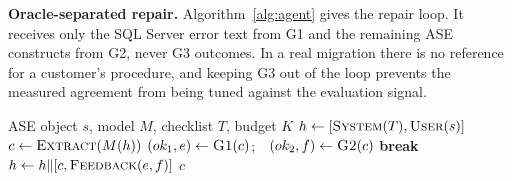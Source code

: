 \textbf{Oracle-separated repair.} Algorithm~\ref{alg:agent} gives the repair loop. It receives only the SQL
Server error text from G1 and the remaining ASE constructs from G2, never G3 outcomes. In a real migration
there is no reference for a customer's procedure, and keeping G3 out of the loop prevents the measured
agreement from being tuned against the evaluation signal.

\begin{algorithm}[t]
\caption{Oracle-separated repair loop}\label{alg:agent}
\footnotesize
\begin{algorithmic}[1]
\Require ASE object $s$, model $M$, checklist $T$, budget $K$
\State $h \gets [\textsc{System}(T), \textsc{User}(s)]$
  \State $c \gets \textsc{Extract}(M(h))$
  \State $(ok_1, e) \gets \textsc{G1}(c)$;\ \ $(ok_2, f) \gets \textsc{G2}(c)$
   \textbf{break} \EndIf
  \State $h \gets h \Vert [c, \textsc{Feedback}(e, f)]$ 
\EndFor
\State \Return $c$ 
\end{algorithmic}
\end{algorithm}
